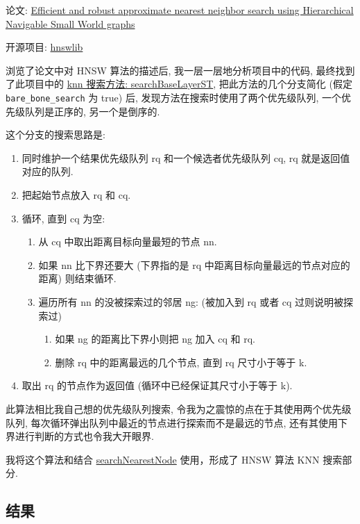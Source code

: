 论文: \href{https://arxiv.org/pdf/1603.09320}{Efficient and robust approximate nearest neighbor search using Hierarchical Navigable Small World graphs}

开源项目: \href{https://github.com/nmslib/hnswlib}{hnswlib}

浏览了论文中对 HNSW 算法的描述后, 我一层一层地分析项目中的代码,
最终找到了此项目中的 \href{../reference/hnswlib/hnswalg.h}{knn 搜索方法: searchBaseLayerST},
把此方法的几个分支简化 (假定 \texttt{bare\_bone\_search} 为 true) 后, 发现方法在搜索时使用了两个优先级队列,
一个优先级队列是正序的, 另一个是倒序的.

这个分支的搜索思路是:

\begin{enumerate}
    \item 同时维护一个结果优先级队列 rq 和一个候选者优先级队列 cq, rq 就是返回值对应的队列.
    \item 把起始节点放入 rq 和 cq.
    \item 循环, 直到 cq 为空:
    \begin{enumerate}
        \item 从 cq 中取出距离目标向量最短的节点 nn.
        \item 如果 nn 比下界还要大 (下界指的是 rq 中距离目标向量最远的节点对应的距离) 则结束循环.
        \item 遍历所有 nn 的没被探索过的邻居 ng:  (被加入到 rq 或者 cq 过则说明被探索过)
        \begin{enumerate}
            \item 如果 ng 的距离比下界小则把 ng 加入 cq 和 rq.
            \item 删除 rq 中的距离最远的几个节点, 直到 rq 尺寸小于等于 k.
        \end{enumerate}
    \end{enumerate}
    \item 取出 rq 的节点作为返回值 (循环中已经保证其尺寸小于等于 k).
\end{enumerate}

此算法相比我自己想的优先级队列搜索, 令我为之震惊的点在于其使用两个优先级队列,
每次循环弹出队列中最近的节点进行探索而不是最远的节点, 还有其使用下界进行判断的方式也令我大开眼界.

我将这个算法和结合 \href{../src/hnsw/Layer.cpp}{searchNearestNode} 使用，形成了 HNSW 算法 KNN 搜索部分.

\subsection{结果}

